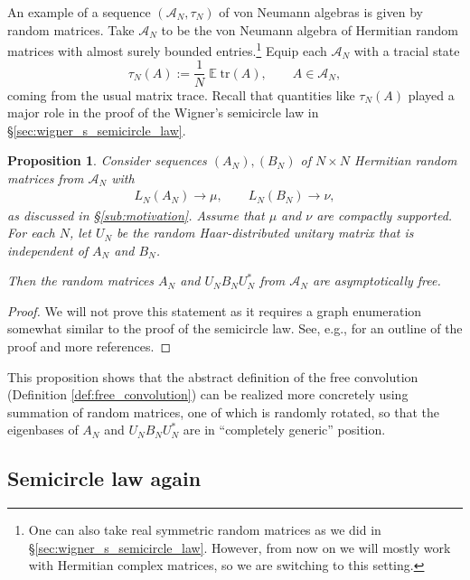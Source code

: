 \documentclass[letterpaper,11pt,oneside,reqno]{amsart}
\numberwithin{equation}{section}
\DeclareMathOperator{\EE}{\mathbb{E}}
\newtheorem{proposition}{Proposition}[section]
\theoremstyle{definition}
\begin{document}
An example of a sequence $(\mathcal{A}_N,\tau_N)$ of von Neumann algebras is 
given by random matrices. Take
$\mathcal{A}_N$ to be the von Neumann algebra of Hermitian
random matrices with almost surely bounded entries.\footnote{One can also take real symmetric random
matrices as we did in \S \ref{sec:wigner_s_semicircle_law}. However,
from now on we will mostly work with Hermitian complex matrices, so we are 
switching to this setting.}
Equip each $\mathcal{A}_N$ with a tracial state
\begin{equation*}
	\tau_N(A):=\frac{1}{N} \EE \text{tr}(A),\qquad A\in\mathcal{A}_N,
\end{equation*}
coming from the usual matrix trace. 
Recall that quantities like $\tau_N(A)$ played a major role in the proof of the
Wigner's semicircle law in \S \ref{sec:wigner_s_semicircle_law}.

\begin{proposition}\label{prop:asymptotically_free}
	Consider sequences $(A_N), (B_N)$ of $N\times N$ Hermitian random matrices from $\mathcal{A}_N$ with 
	\begin{align*}
		L_N(A_N)\to \mu ,\qquad L_N(B_N)\to \nu,
	\end{align*}
	as discussed in \S \ref{sub:motivation}. Assume that $\mu$ and $\nu$ are compactly supported.
	For each $N$, let $U_N$ be the random Haar-distributed unitary matrix 
	that is independent of $A_N$ and $B_N$. 

	Then the random matrices $A_N$ and $U_NB_NU^*_N$ from $\mathcal{A}_N$ 
	are asymptotically free.  
\end{proposition}
\begin{proof}
	We will not prove this statement as it requires a graph enumeration somewhat similar to the proof 
	of the semicircle law. See, e.g., \cite[\S 3.6]{Novak2012FreeLectures} for an outline of the proof
	and more references.
\end{proof}

This proposition shows that the abstract definition of the free convolution (Definition \ref{def:free_convolution})
can be realized more concretely using summation of random matrices, one of which is randomly rotated, 
so that the eigenbases of $A_N$ and $U_NB_NU^*_N$ are in ``completely generic'' position.


\subsection{Semicircle law again} %
\label{sub:semicircle_law_again}
\end{document}
